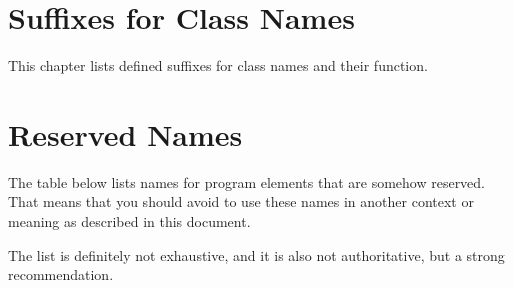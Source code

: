 
\renewcommand{\cellalign}{tl}


\section{Suffixes for Class Names}\label{sec:SuffixesForClassNames}
This chapter lists defined suffixes for class names and their function.

\renewcommand{\cellalign}{tl}

\section{Reserved Names}

The table below lists names for program elements that are somehow reserved. That means that you should avoid to use these names in another context or meaning as described in this document.

The list is definitely not exhaustive, and it is also not authoritative, but a strong recommendation.

\renewcommand{\cellalign}{tl}




